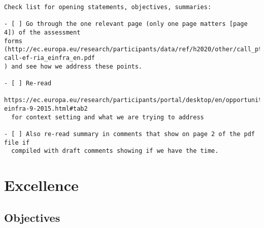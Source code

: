 \documentclass[noworkareas,deliverables,\classoptions]{euproposal}       %
\begin{document}
\begin{proposal}
\begin{draft}
\begin{verbatim}
Check list for opening statements, objectives, summaries:

- [ ] Go through the one relevant page (only one page matters [page 4]) of the assessment
forms
(http://ec.europa.eu/research/participants/data/ref/h2020/other/call_ptef/ef/h2020-call-ef-ria_einfra_en.pdf
) and see how we address these points. 

- [ ] Re-read
  https://ec.europa.eu/research/participants/portal/desktop/en/opportunities/h2020/topics/2144-einfra-9-2015.html#tab2
  for context setting and what we are trying to address

- [ ] Also re-read summary in comments that show on page 2 of the pdf file if
  compiled with draft comments showing if we have the time.
\end{verbatim}
\clearpage
\end{draft}




\section{Excellence}


\subsection{Objectives}
\label{sect:objectives}



\end{proposal}
\end{document}

